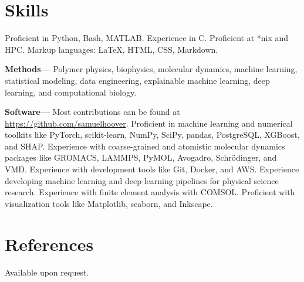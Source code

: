 \documentclass[margin,line]{res}
\begin{document}
\begin{resume}
\begin{itemize}
	\end{itemize}

	\section{\sc Skills}
	Proficient in Python, Bash, MATLAB.
	Experience in C.
	Proficient at *nix and HPC.
	Markup languages: \LaTeX, HTML, CSS, Markdown.


		{\bf Methods---}%
	Polymer physics, biophysics, molecular dynamics, machine learning,
	statistical modeling, data engineering, explainable machine learning, deep
	learning, and computational biology.


		{\bf Software---}%
	Most contributions can be found at \url{https://github.com/samuelhoover}.
	Proficient in machine learning and numerical toolkits like PyTorch,
	scikit-learn, NumPy, SciPy, pandas, PostgreSQL, XGBoost, and SHAP.
	Experience with coarse-grained and atomistic molecular dynamics packages like
	GROMACS, LAMMPS, PyMOL, Avogadro, Schr\"odinger, and VMD.
	Experience with development tools like Git, Docker, and AWS.
	Experience developing machine learning and deep learning pipelines for
	physical science research.
	Experience with finite element analysis with COMSOL.
	Proficient with visualization tools like Matplotlib, seaborn, and Inkscape.


	\ifx\nopubs\undefined
		
	\else
	\fi

	


	\section{\sc References}
	\parbox{\textwidth}{%
		Available upon request.
	}

\end{resume}
\end{document}

